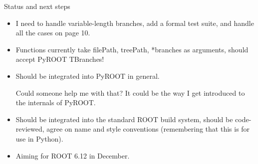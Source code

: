 \documentclass{beamer}
\begin{document}
\begin{frame}{Status and next steps}
\vspace{0.5 cm}
\large
\begin{itemize}\setlength{\itemsep}{0.35 cm}
\item I need to handle variable-length branches, add a formal test suite, and handle all the cases on page 10.

\item Functions currently take filePath, treePath, *branches as arguments, should accept PyROOT TBranches!
\item Should be integrated into PyROOT in general.

\vspace{0.25 cm}
Could someone help me with that? It could be the way I get introduced to the internals of PyROOT.

\item Should be integrated into the standard ROOT build system, should be code-reviewed, agree on name and style conventions (remembering that this is for use in Python).

\item Aiming for ROOT 6.12 in December.
\end{itemize}
\end{frame}
\end{document}
